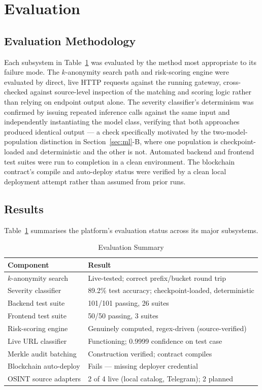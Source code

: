 \documentclass[conference]{IEEEtran}
\begin{document}
\section{Evaluation}
\label{sec:eval}

\subsection{Evaluation Methodology}
Each subsystem in Table~\ref{tab:eval} was evaluated by the method most appropriate to its failure mode. The $k$-anonymity search path and risk-scoring engine were evaluated by direct, live HTTP requests against the running gateway, cross-checked against source-level inspection of the matching and scoring logic rather than relying on endpoint output alone. The severity classifier's determinism was confirmed by issuing repeated inference calls against the same input and independently instantiating the model class, verifying that both approaches produced identical output --- a check specifically motivated by the two-model-population distinction in Section~\ref{sec:ml}-B, where one population is checkpoint-loaded and deterministic and the other is not. Automated backend and frontend test suites were run to completion in a clean environment. The blockchain contract's compile and auto-deploy status were verified by a clean local deployment attempt rather than assumed from prior runs.

\subsection{Results}
Table~\ref{tab:eval} summarises the platform's evaluation status across its major subsystems.

\begin{table}[htbp]
\caption{Evaluation Summary}
\label{tab:eval}
\centering
\scriptsize
\begin{tabular}{lp{4.8cm}}
\toprule
\textbf{Component} & \textbf{Result} \\
\midrule
$k$-anonymity search & Live-tested; correct prefix/bucket round trip \\
Severity classifier & 89.2\% test accuracy; checkpoint-loaded, deterministic \\
Backend test suite & 101/101 passing, 26 suites \\
Frontend test suite & 50/50 passing, 3 suites \\
Risk-scoring engine & Genuinely computed, regex-driven (source-verified) \\
Live URL classifier & Functioning; 0.9999 confidence on test case \\
Merkle audit batching & Construction verified; contract compiles \\
Blockchain auto-deploy & Fails --- missing deployer credential \\
OSINT source adapters & 2 of 4 live (local catalog, Telegram); 2 planned \\
\bottomrule
\end{tabular}
\end{table}
\end{document}
